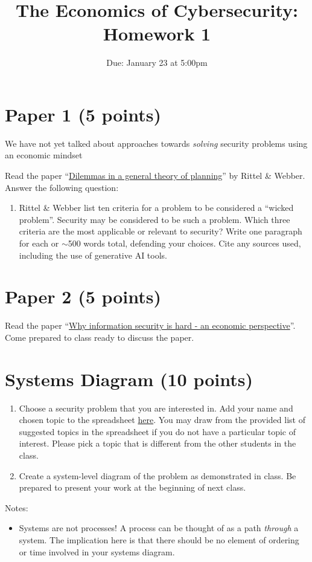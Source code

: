 \documentclass[11pt]{article}
\title{The Economics of Cybersecurity: Homework 1}
\date{Due: January 23 at 5:00pm}
\author{}
\begin{document}
\maketitle

\section{Paper 1 (5 points)}

We have not yet talked about approaches towards {\it solving} security problems using an economic mindset 

Read the paper ``\href{https://link.springer.com/article/10.1007/bf01405730}{Dilemmas in a general theory of planning}'' by Rittel \& Webber. Answer the following question:

\begin{enumerate}
    \item Rittel \& Webber list ten criteria for a problem to be considered a ``wicked problem''. Security may be considered to be such a problem. Which three criteria are the most applicable or relevant to security? Write one paragraph for each or $\sim$500 words total, defending your choices. Cite any sources used, including the use of generative AI tools.  
\end{enumerate}

\section{Paper 2 (5 points)}

Read the paper ``\href{https://ieeexplore.ieee.org/abstract/document/991552}{Why information security is hard - an economic perspective}''. Come prepared to class ready to discuss the paper.


\section{Systems Diagram (10 points)}

\begin{enumerate}
    \item Choose a security problem that you are interested in. Add your name and chosen topic to the spreadsheet \href{https://docs.google.com/spreadsheets/d/1SdaMpeCo4CE8o0U_irGhWmVXJYHybRWoiX4uwZYMhCE/edit#gid=0}{here}. You may draw from the provided list of suggested topics in the spreadsheet if you do not have a particular topic of interest. Please pick a topic that is different from the other students in the class.
    \item Create a system-level diagram of the problem as demonstrated in class. Be prepared to present your work at the beginning of next class.
\end{enumerate}

Notes:
\begin{itemize}
    \item Systems are not processes! A process can be thought of as a path {\it through} a system. The implication here is that there should be no element of ordering or time involved in your systems diagram.
\end{itemize}
\end{document}
